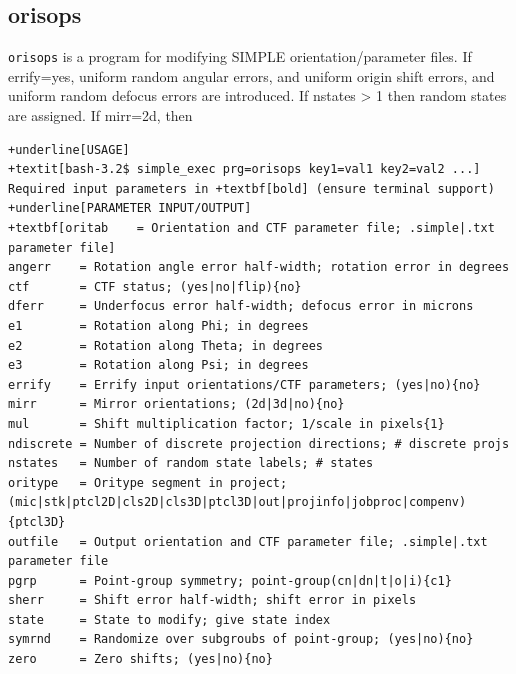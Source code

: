 \documentclass[a4paper,11pt]{article}
\newcommand{\prgname}[1]{\textcolor{NavyBlue}{\texttt{#1}}}
\begin{document}
\subsection{orisops}
\label{orisops}
\prgname{orisops} is a program for modifying SIMPLE orientation/parameter files. If errify=yes, uniform random angular errors, and uniform origin shift errors, and uniform random defocus errors are introduced. If nstates > 1 then random states are assigned. If mirr=2d, then
\begin{Verbatim}[commandchars=+\[\],fontsize=\small,breaklines=true]
+underline[USAGE]
+textit[bash-3.2$ simple_exec prg=orisops key1=val1 key2=val2 ...]
Required input parameters in +textbf[bold] (ensure terminal support)
+underline[PARAMETER INPUT/OUTPUT]
+textbf[oritab    = Orientation and CTF parameter file; .simple|.txt parameter file]
angerr    = Rotation angle error half-width; rotation error in degrees
ctf       = CTF status; (yes|no|flip){no}
dferr     = Underfocus error half-width; defocus error in microns
e1        = Rotation along Phi; in degrees
e2        = Rotation along Theta; in degrees
e3        = Rotation along Psi; in degrees
errify    = Errify input orientations/CTF parameters; (yes|no){no}
mirr      = Mirror orientations; (2d|3d|no){no}
mul       = Shift multiplication factor; 1/scale in pixels{1}
ndiscrete = Number of discrete projection directions; # discrete projs
nstates   = Number of random state labels; # states
oritype   = Oritype segment in project; (mic|stk|ptcl2D|cls2D|cls3D|ptcl3D|out|projinfo|jobproc|compenv){ptcl3D}
outfile   = Output orientation and CTF parameter file; .simple|.txt parameter file
pgrp      = Point-group symmetry; point-group(cn|dn|t|o|i){c1}
sherr     = Shift error half-width; shift error in pixels
state     = State to modify; give state index
symrnd    = Randomize over subgroubs of point-group; (yes|no){no}
zero      = Zero shifts; (yes|no){no}
\end{Verbatim}
\end{document}
